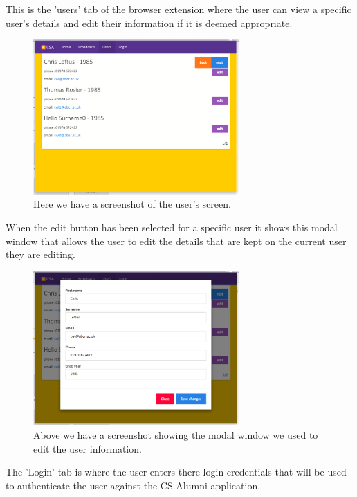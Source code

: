 \documentclass{article}
\begin{document}
This is the 'users' tab of the browser extension where the user can view a specific user's details and edit their information if it is deemed appropriate.

\begin{figure}[H]
\centering
\includegraphics[width=0.7\textwidth]{userpage}
\caption{Here we have a screenshot of the user's screen.}
\end{figure}

When the edit button has been selected for a specific user it shows this modal window that allows the user to edit the details that are kept on the current user they are editing.

\begin{figure}[H]
\centering
\includegraphics[width=0.7\textwidth]{modalpage}
\caption{Above we have a screenshot showing the modal window we used to edit the user information.}
\end{figure}

\newpage
The 'Login' tab is where the user enters there login credentials that will be used to authenticate the user against the CS-Alumni application.
\end{document}
